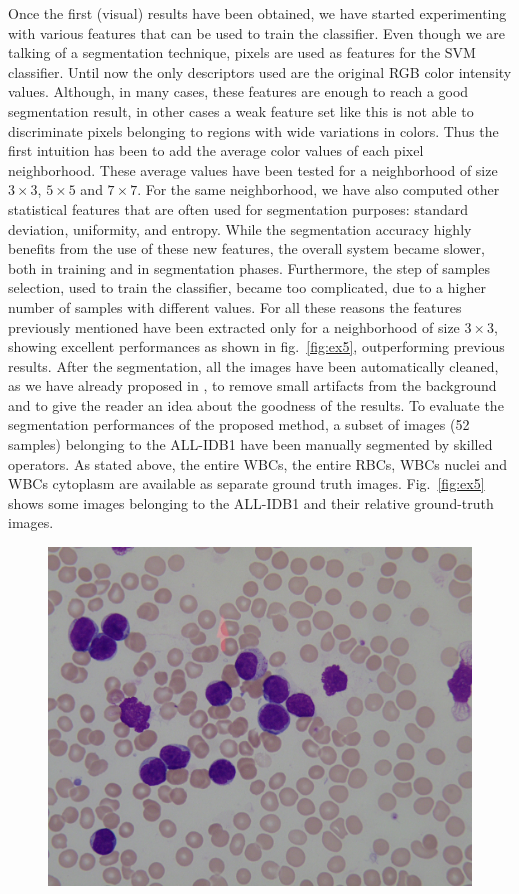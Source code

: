 \documentclass[final,a4paper,12pt,english]{UnicaPhdThesis3}
\begin{document}
{%
Once the first (visual) results have been obtained, we have started experimenting with various features that can be used to train the classifier.
Even though we are talking of a segmentation technique, pixels are used as features for the SVM classifier. Until now the only descriptors used are the original RGB color intensity values. Although, in many cases, these features are enough to reach a good segmentation result, in other cases a weak feature set like this is not able to discriminate pixels belonging to regions with wide variations in colors. Thus the first intuition has been to add the average color values of each pixel neighborhood. These average values have been tested for a neighborhood of size $3 \times 3$, $5 \times 5$ and $7 \times 7$. For the same neighborhood, we have also computed other statistical features that are often used for segmentation purposes: standard deviation, uniformity, and entropy. While the segmentation accuracy highly benefits from the use of these new features, the overall system became slower, both in training and in segmentation phases.
Furthermore, the step of samples selection, used to train the classifier, became too complicated, due to a higher number of samples with different values. For all these reasons the features previously mentioned have been extracted only for a neighborhood of size $3 \times 3$, showing excellent performances as shown in fig.~\ref{fig:ex5}, outperforming previous results. After the segmentation, all the images have been automatically cleaned, as we have already proposed in \cite{Put13c}, to remove small artifacts from the background and to give the reader an idea about the goodness of the results.
To evaluate the segmentation performances of the proposed method, a subset of images (52 samples) belonging to the ALL-IDB1 have been manually segmented by skilled operators. As stated above, the entire WBCs, the entire RBCs, WBCs nuclei and WBCs cytoplasm are available as separate ground truth images. Fig.~\ref{fig:ex5} shows some images belonging to the ALL-IDB1 and their relative ground-truth images.
\begin{figure}[!b]
	\centering
	\includegraphics[height=0.18\textwidth]{images/2015_1_caip/Im003_1}

\end{figure}}
\end{document}
